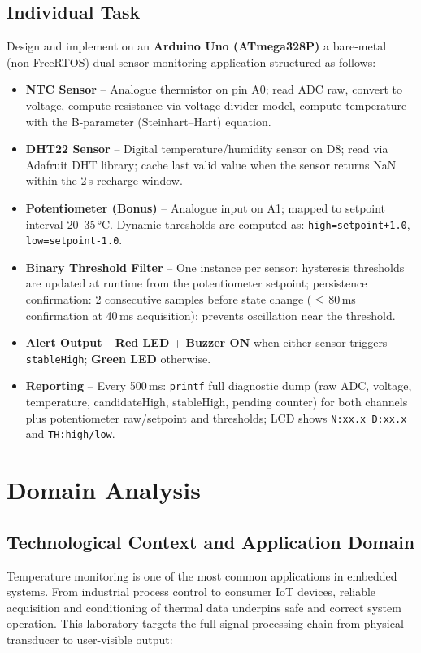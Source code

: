 \documentclass[12pt]{article}
\begin{document}
\subsection*{Individual Task}
\hspace{0.8cm} Design and implement on an \textbf{Arduino Uno (ATmega328P)} a bare-metal (non-FreeRTOS) dual-sensor monitoring application structured as follows:

\begin{itemize}
    \item \textbf{NTC Sensor} -- Analogue thermistor on pin A0; read ADC raw, convert to voltage, compute resistance via voltage-divider model, compute temperature with the B-parameter (Steinhart--Hart) equation.
    \item \textbf{DHT22 Sensor} -- Digital temperature/humidity sensor on D8; read via Adafruit DHT library; cache last valid value when the sensor returns NaN within the 2\,s recharge window.
    \item \textbf{Potentiometer (Bonus)} -- Analogue input on A1; mapped to setpoint interval 20--35\,°C. Dynamic thresholds are computed as: \texttt{high=setpoint+1.0}, \texttt{low=setpoint-1.0}.
    \item \textbf{Binary Threshold Filter} -- One instance per sensor; hysteresis thresholds are updated at runtime from the potentiometer setpoint; persistence confirmation: 2 consecutive samples before state change ($\leq$\,80\,ms confirmation at 40\,ms acquisition); prevents oscillation near the threshold.
    \item \textbf{Alert Output} -- \textbf{Red LED} + \textbf{Buzzer ON} when either sensor triggers \texttt{stableHigh}; \textbf{Green LED} otherwise.
    \item \textbf{Reporting} -- Every 500\,ms: \texttt{printf} full diagnostic dump (raw ADC, voltage, temperature, candidateHigh, stableHigh, pending counter) for both channels plus potentiometer raw/setpoint and thresholds; LCD shows \texttt{N:xx.x D:xx.x} and \texttt{TH:high/low}.
\end{itemize}

\section{Domain Analysis}

\subsection{Technological Context and Application Domain}
\hspace{0.8cm} Temperature monitoring is one of the most common applications in embedded systems. From industrial process control to consumer IoT devices, reliable acquisition and conditioning of thermal data underpins safe and correct system operation. This laboratory targets the full signal processing chain from physical transducer to user-visible output:
\end{document}
